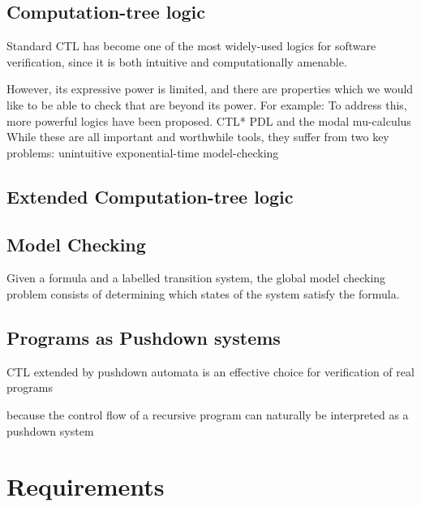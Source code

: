 \documentclass[11pt]{article}
\begin{document}
\subsection{Computation-tree logic}

Standard CTL has become %
one of the most widely-used logics for software verification, since it is both intuitive and computationally amenable.




However, its expressive power is limited, and there are properties which we would like to be able to check that are beyond its power.
For example: 
To address this, more powerful logics have been proposed. CTL* %
 PDL %
and the modal mu-calculus
While these are all important and worthwhile tools, they suffer from two key problems: 
unintuitive
exponential-time model-checking




\subsection{Extended Computation-tree logic}






\cite{Kreutzer10}

\subsection{Model Checking}

Given a formula and a labelled transition system, the global model checking
problem consists of determining which states of the system satisfy the formula.


\subsection{Programs as Pushdown systems}

CTL extended by pushdown automata is an effective choice for verification of real programs

because the control flow of a recursive program can naturally be 
interpreted
as a pushdown system

\section{Requirements}
\end{document}
